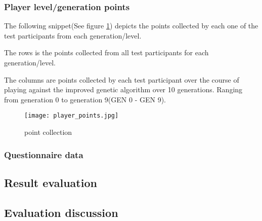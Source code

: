 \subsubsection{Player level/generation points}
The following snippet(See figure \ref{fig:point_collection}) depicts the points collected by each one of the test participants from each generation/level.

The rows is the points collected from all test participants for each generation/level.

The columns are points collected by each test participant over the course of playing against the improved genetic algorithm over 10 generations. Ranging from generation 0 to generation 9(GEN 0 - GEN 9).
\begin{figure}[!htbp]
\centering
\texttt{[image: player\_points.jpg]}
\caption{point collection}
\label{fig:point_collection}
\end{figure}

\subsubsection{Questionnaire data}



\subsection{Result evaluation}
\subsection{Evaluation discussion}